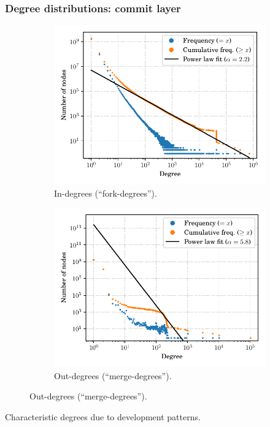 \documentclass[aspectratio=169,xcolor=table]{beamer}
\begin{document}
    \begin{frame}
        \frametitle{Degree distributions: commit layer}
        \begin{figure}
            \begin{subfigure}{.49\textwidth}
                \centering
                \includegraphics[width=\linewidth]{../img/topology/inout/rev_in}
                \caption{In-degrees (``fork-degrees'').}
            \end{subfigure}\hfill
            \begin{subfigure}{.49\textwidth}
                \centering
                \includegraphics[width=\linewidth]{../img/topology/inout/rev_out}
                \caption{Out-degrees (``merge-degrees'').}
            \end{subfigure}
        \end{figure}

        \begin{block}{}
            Characteristic degrees due to development patterns.
        \end{block}
    \end{frame}
\end{document}
